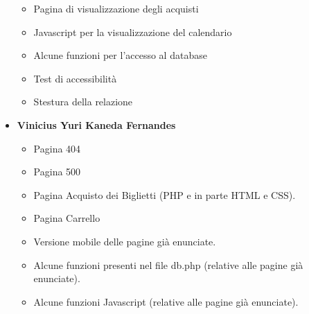 \begin{itemize}
\begin{itemize}
            \item Pagina di visualizzazione degli acquisti
            \item Javascript per la visualizzazione del calendario
            \item Alcune funzioni per l'accesso al database
            \item Test di accessibilità
            \item Stestura della relazione
        \end{itemize}
    \item \textbf{Vinicius Yuri Kaneda Fernandes}
        \begin{itemize}
            \item Pagina 404 
            \item Pagina 500 
            \item Pagina Acquisto dei Biglietti (PHP e in parte HTML e CSS).
            \item Pagina Carrello 
            \item Versione mobile delle pagine già enunciate.
            \item Alcune funzioni presenti nel file db.php (relative alle pagine già enunciate).
            \item Alcune funzioni Javascript (relative alle pagine già enunciate).
        \end{itemize}
\end{itemize}